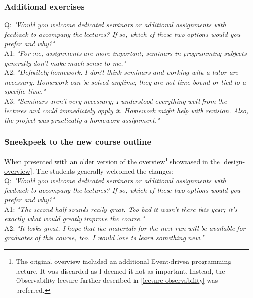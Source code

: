 \documentclass[
  digital,
  color,
  oneside,
  nosansbold,
  nocolorbold,
  lof,
  lot,
]{fithesis4}
\begin{document}
\subsubsection{Additional exercises}

\noindent
Q: \textit{
"Would you welcome dedicated seminars or additional assignments with feedback to accompany the lectures? If so, which of these two options would you prefer and why?"} \\

\noindent
A1: \textit{"For me, assignments are more important; seminars in programming subjects generally don't make much sense to me."} \\

\noindent
A2: \textit{"Definitely homework. I don't think seminars and working with a tutor are necessary. Homework can be solved anytime; they are not time-bound or tied to a specific time."} \\

\noindent
A3: \textit{"Seminars aren't very necessary; I understood everything well from the lectures and could immediately apply it. Homework might help with revision. Also, the project was practically a homework assignment."} \\

\subsubsection{Sneekpeek to the new course outline}

\noindent
When presented with an older version of the overview\footnote{The original overview included an additional Event-driven programming lecture. It was discarded as I deemed it not as important. Instead, the Observability lecture further described in \cref{lecture-observability} was preferred.}
showcased in the \cref{design-overview}. The students generally welcomed the changes: \\

\noindent
Q: \textit{
"Would you welcome dedicated seminars or additional assignments with feedback to accompany the lectures? If so, which of these two options would you prefer and why?"} \\

\noindent
A1: \textit{"The second half sounds really great. Too bad it wasn't there this year; it's exactly what would greatly improve the course."} \\

\noindent
A2: \textit{"It looks great. I hope that the materials for the next run will be available for graduates of this course, too. I would love to learn something new."} \\
\end{document}

